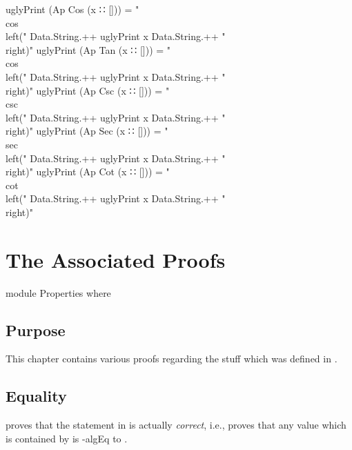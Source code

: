 \documentclass{report}
\begin{document}
\begin{code}
  uglyPrint (Ap Cos (x ∷ [])) =
    "\\cos \\left(" Data.String.++ uglyPrint x Data.String.++ "\\right)"
  uglyPrint (Ap Tan (x ∷ [])) =
    "\\cos \\left(" Data.String.++ uglyPrint x Data.String.++ "\\right)"
  uglyPrint (Ap Csc (x ∷ [])) =
    "\\csc \\left(" Data.String.++ uglyPrint x Data.String.++ "\\right)"
  uglyPrint (Ap Sec (x ∷ [])) =
    "\\sec \\left(" Data.String.++ uglyPrint x Data.String.++ "\\right)"
  uglyPrint (Ap Cot (x ∷ [])) =
    "\\cot \\left(" Data.String.++ uglyPrint x Data.String.++ "\\right)"
\end{code}

\chapter{The Associated Proofs}

\begin{code}
  module Properties where
\end{code}

\section{Purpose}
This chapter contains various proofs regarding the stuff which was defined in .

\section{ Equality}
 proves that the statement in  is actually \emph{correct}, i.e.,  proves that any value which is contained by   is -\gls{algEq} to .
\end{document}
